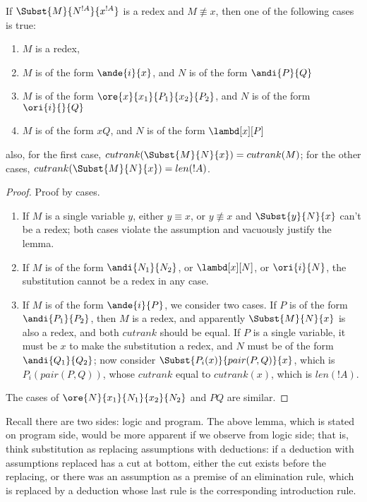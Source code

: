 \documentclass[../../../include/open-logic-section]{subfiles}
\begin{document}
\begin{lem}
  If $\Subst{M}{N^{!A}}{x^{!A}}$ is a redex and $M \not\equiv x$, then one of the
  following cases is true:
  \begin{enumerate}
  \item $M$ is a redex,
  \item $M$ is of the form $\ande{i}{x}$, and $N$ is of the form
    $\andi{P}{Q}$
  \item $M$ is of the form $\ore{x}{x_1}{P_1}{x_2}{P_2}$, and $N$ is of
    the form $\ori{i}{}{Q}$
  \item $M$ is of the form $x Q$, and $N$ is of the form $\lambd[x][P]$
  \end{enumerate}
  also, for the first case, $cutrank(\Subst{M}{N}{x}) = cutrank(M)$;
  for the other cases, $cutrank(\Subst{M}{N}{x}) = len(!A)$.
\end{lem}
\begin{proof}
  Proof by cases.

  \begin{enumerate}
  \item
    If $M$ is a single variable $y$, either $y \equiv x$,  or $y \not\equiv x$
    and $\Subst{y}{N}{x}$ can't be a redex; both cases violate
    the assumption and vacuously justify the lemma.
    
  \item
    If $M$ is of the form $\andi{N_1}{N_2}$, or $\lambd[x][N]$, or
    $\ori{i}{N}$, the substitution cannot be a redex in any case.

  \item If $M$ is of the form $\ande{i}{P}$, we consider two cases. If $P$ is of
    the form $\andi{P_1}{P_2}$, then $M$ is a redex, and apparently
    $\Subst{M}{N}{x}$ is also a redex, and both $cutrank$ should be
    equal. If $P$ is a single variable, it must be $x$ to make the
    substitution a redex, and $N$ must be of the form $\andi{Q_1}{Q_2}$; now
    consider $\Subst{P_i(x)}{pair(P,Q)}{x}$, which is $P_i(pair(P,Q))$,
    whose $cutrank$ equal to $cutrank(x)$, which is $len(!A)$.
    
  \end{enumerate}
  The cases of $\ore{N}{x_1}{N_1}{x_2}{N_2}$ and $P Q$ are similar.
\end{proof}

\begin{rem}
  Recall there are two sides: logic and program. The above lemma, which
  is stated on program side, would be more apparent if we observe from logic
  side; that is, think substitution as replacing assumptions with
  deductions: if a deduction with assumptions replaced has a cut at
  bottom, either the cut exists before the replacing, or there was
  an assumption as a premise of an elimination rule, which is
  replaced by a deduction whose last rule is the corresponding
  introduction rule.
\end{rem}
\end{document}
